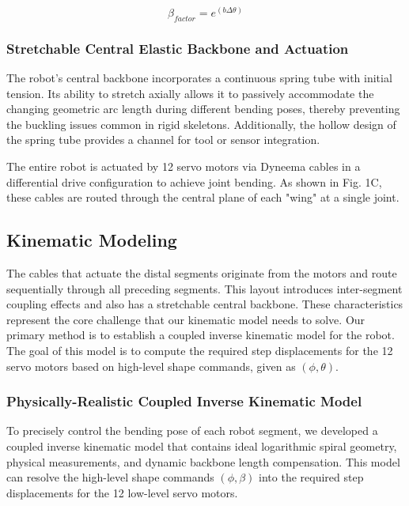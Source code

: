\documentclass[conference]{IEEEtran}
\begin{document}
\begin{equation}
    \beta_{factor} = e^{(b\Delta\theta)}
    \label{eq:beta_factor}
\end{equation}

\subsubsection{Stretchable Central Elastic Backbone and Actuation}

The robot's central backbone incorporates a continuous spring tube with initial tension. Its ability to stretch axially allows it to passively accommodate the changing geometric arc length during different bending poses, thereby preventing the buckling issues common in rigid skeletons. Additionally, the hollow design of the spring tube provides a channel for tool or sensor integration.

The entire robot is actuated by 12 servo motors via Dyneema cables in a differential drive configuration to achieve joint bending. As shown in Fig. 1C, these cables are routed through the central plane of each "wing" at a single joint.

\subsection{Kinematic Modeling}
The cables that actuate the distal segments originate from the motors and route sequentially through all preceding segments. This layout introduces inter-segment coupling effects and also has a stretchable central backbone. These characteristics represent the core challenge that our kinematic model needs to solve. Our primary method is to establish a coupled inverse kinematic model for the robot. The goal of this model is to compute the required step displacements for the 12 servo motors based on high-level shape commands, given as $(\phi, \theta)$.

\subsubsection{Physically-Realistic Coupled Inverse Kinematic Model}
To precisely control the bending pose of each robot segment, we developed a coupled inverse kinematic model that contains ideal logarithmic spiral geometry, physical measurements, and dynamic backbone length compensation. This model can resolve the high-level shape commands $(\phi, \beta)$ into the required step displacements for the 12 low-level servo motors.
\end{document}
